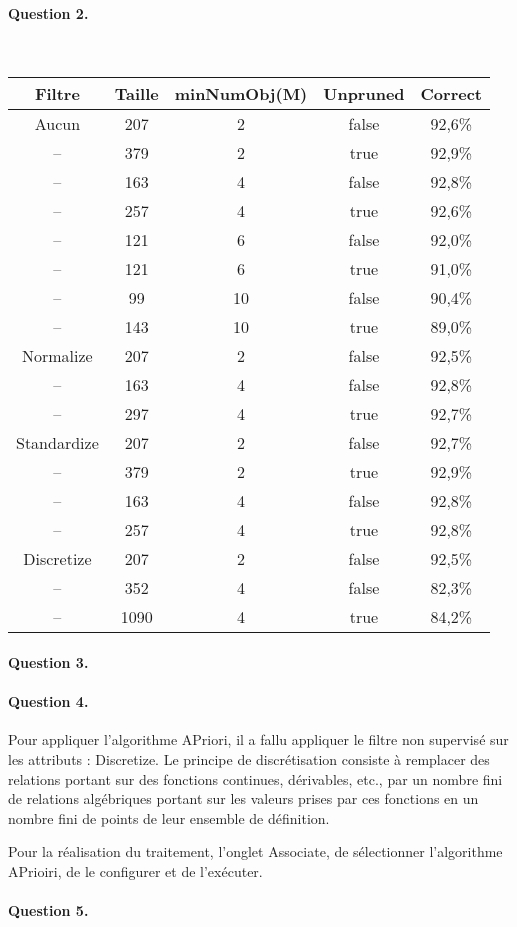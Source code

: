 \documentclass[a4paper,11pt]{article}
\begin{document}
\paragraph{Question 2.} ~\\
\begin{center}
	\begin{tabular}{|c|c|c|c|c|}
		\hline
		\textbf{Filtre} 	& \textbf{Taille} 	& \textbf{minNumObj(M)} 	& \textbf{Unpruned} 	& \textbf{Correct} \\
		\hline
		\hline
		Aucun	& 207		& 2					& false						& 92,6\% \\
		-- 		& 379		& 2					& true						& 92,9\% \\
		\rowcolor{green} -- 		& 163		& 4					& false						& 92,8\% \\
		-- 		& 257		& 4					& true						& 92,6\% \\
		-- 		& 121		& 6					& false						& 92,0\% \\
		-- 		& 121		& 6					& true						& 91,0\% \\
		-- 		& 99		& 10				& false						& 90,4\% \\
		-- 		& 143		& 10				& true						& 89,0\% \\
		\hline
		\hline
		Normalize 		& 207		& 2					& false						& 92,5\% \\
		-- 				& 163		& 4					& false						& 92,8\% \\
		-- 				& 297		& 4					& true						& 92,7\% \\
		\hline
		\hline
		Standardize 		& 207		& 2					& false						& 92,7\% \\
		-- 					& 379		& 2					& true						& 92,9\% \\
		-- 					& 163		& 4					& false						& 92,8\% \\
		-- 					& 257		& 4					& true						& 92,8\% \\
		\hline
		\hline
		Discretize 		& 207		& 2					& false						& 92,5\% \\
		-- 				& 352		& 4					& false						& 82,3\% \\
		-- 				& 1090		& 4					& true						& 84,2\% \\
		\hline
	\end{tabular}
\end{center}
\paragraph{Question 3.}

\paragraph{Question 4.}
    Pour appliquer l'algorithme \og{}APriori\fg{}, il a fallu appliquer le filtre non supervisé sur les attributs : \og{}Discretize\fg{}. Le principe de discrétisation consiste à remplacer des relations portant sur des fonctions continues, dérivables, etc., par un nombre fini de relations algébriques portant sur les valeurs prises par ces fonctions en un nombre fini de points de leur ensemble de définition.
    
    Pour la réalisation du traitement, l'onglet \og{}Associate\fg{}, de sélectionner  l'algorithme APrioiri, de le configurer et de l'exécuter.

\paragraph{Question 5.}



				
		
\end{document}
